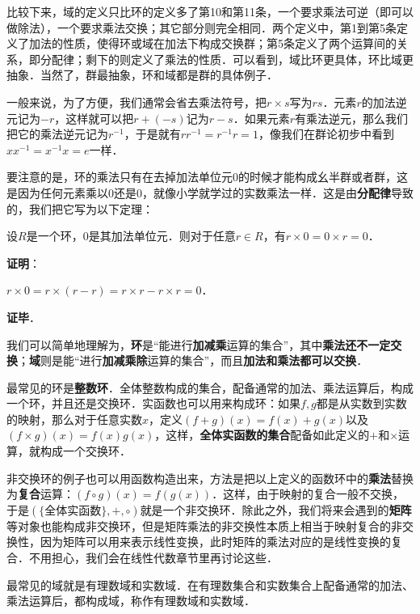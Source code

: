 比较下来，域的定义只比环的定义多了第10和第11条，一个要求乘法可逆（即可以做除法），一个要求乘法交换；其它部分则完全相同．两个定义中，第1到第5条定义了加法的性质，使得环或域在加法下构成交换群；第5条定义了两个运算间的关系，即分配律；剩下的则定义了乘法的性质．可以看到，域比环更具体，环比域更抽象．当然了，群最抽象，环和域都是群的具体例子．

一般来说，为了方便，我们通常会省去乘法符号，把$r\times s$写为$rs$．元素$r$的加法逆元记为$-r$，这样就可以把$r+(-s)$记为$r-s$．如果元素$r$有乘法逆元，那么我们把它的乘法逆元记为$r^{-1}$，于是就有$rr^{-1}=r^{-1}r=1$，像我们在群论初步中看到$xx^{-1}=x^{-1}x=e$一样．

要注意的是，环的乘法只有在去掉加法单位元$0$的时候才能构成幺半群或者群，这是因为任何元素乘以$0$还是$0$，就像小学就学过的实数乘法一样．这是由\textbf{分配律}导致的，我们把它写为以下定理：

\begin{theorem}{}
设$R$是一个环，$0$是其加法单位元．则对于任意$r\in R$，有$r\times 0=0\times r=0$．
\end{theorem}
\textbf{证明}：

$r\times 0=r\times (r-r)=r\times r-r\times r=0$．

\textbf{证毕}．



我们可以简单地理解为，\textbf{环}是“能进行\textbf{加减乘}运算的集合”，其中\textbf{乘法还不一定交换}；\textbf{域}则是能“进行\textbf{加减乘除}运算的集合”，而且\textbf{加法和乘法都可以交换}．

最常见的环是\textbf{整数环}．全体整数构成的集合，配备通常的加法、乘法运算后，构成一个环，并且还是交换环．实函数也可以用来构成环：如果$f, g$都是从实数到实数的映射，那么对于任意实数$x$，定义$(f+g)(x)=f(x)+g(x)$以及$(f\times g)(x)=f(x)g(x)$，这样，\textbf{全体实函数的集合}配备如此定义的$+$和$\times$运算，就构成一个交换环．

非交换环的例子也可以用函数构造出来，方法是把以上定义的函数环中的\textbf{乘法}替换为\textbf{复合}运算：$(f\circ g)(x)=f(g(x))$．这样，由于映射的复合一般不交换，于是$(\{\text{全体实函数}\}, +, \circ)$就是一个非交换环．除此之外，我们将来会遇到的\textbf{矩阵}等对象也能构成非交换环，但是矩阵乘法的非交换性本质上相当于映射复合的非交换性，因为矩阵可以用来表示线性变换，此时矩阵的乘法对应的是线性变换的复合．不用担心，我们会在线性代数章节里再讨论这些．

最常见的域就是有理数域和实数域．在有理数集合和实数集合上配备通常的加法、乘法运算后，都构成域，称作有理数域和实数域．

